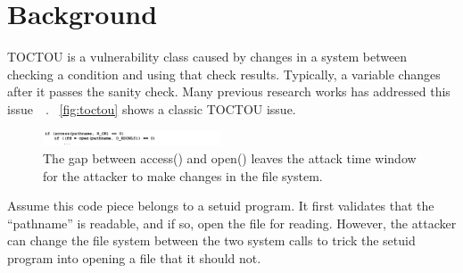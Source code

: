
\section{Background}
\label{sec:background}




TOCTOU is a vulnerability class caused by changes in a system between checking a condition and using that check results. Typically, a variable changes after it passes the sanity check. Many previous research works has addressed this issue~\cite{dean2004fixing}~\cite{borisov2005fixing}. ~\autoref{fig:toctou} shows a classic TOCTOU issue.

\begin{figure}[th]
	\includegraphics[width=0.47\textwidth]{figures/toctou}
	\centering
	\caption{The gap between access() and open() leaves the attack time window for the attacker to make changes in the file system.}
	\label{fig:toctou}
\end{figure}




Assume this code piece belongs to a setuid program. It first validates that the ``pathname'' is readable, and if so, open the file for reading. However, the attacker can change the file system between the two system calls to trick the setuid program into opening a file that it should not.

